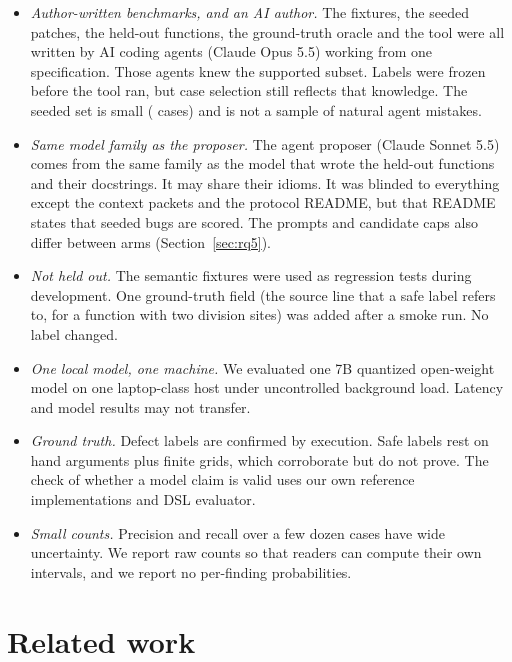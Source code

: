 \documentclass[10pt,twocolumn]{article}
\begin{document}
\begin{itemize}
\item \emph{Author-written benchmarks, and an AI author.} The fixtures, the seeded patches, the held-out functions, the
  ground-truth oracle and the tool were all written by AI coding agents (Claude Opus 5.5) working from one
  specification. Those agents knew the supported subset. Labels were frozen before the tool ran, but case selection
  still reflects that knowledge. The seeded set is small (\SeedCases{} cases) and is not a sample of natural agent
  mistakes.
\item \emph{Same model family as the proposer.} The agent proposer (Claude Sonnet 5.5) comes from the same family as the
  model that wrote the held-out functions and their docstrings. It may share their idioms. It was blinded to everything
  except the context packets and the protocol README, but that README states that seeded bugs are scored. The prompts
  and candidate caps also differ between arms (Section~\ref{sec:rq5}).
\item \emph{Not held out.} The semantic fixtures were used as regression tests during development. One ground-truth
  field (the source line that a safe label refers to, for a function with two division sites) was added after a smoke
  run. No label changed.
\item \emph{One local model, one machine.} We evaluated one 7B quantized open-weight model on one laptop-class host
  under uncontrolled background load. Latency and model results may not transfer.
\item \emph{Ground truth.} Defect labels are confirmed by execution. Safe labels rest on hand arguments plus finite
  grids, which corroborate but do not prove. The check of whether a model claim is valid uses our own reference
  implementations and DSL evaluator.
\item \emph{Small counts.} Precision and recall over a few dozen cases have wide uncertainty. We report raw counts so that
  readers can compute their own intervals, and we report no per-finding probabilities.
\end{itemize}

\section{Related work}
\label{sec:related}
\end{document}
